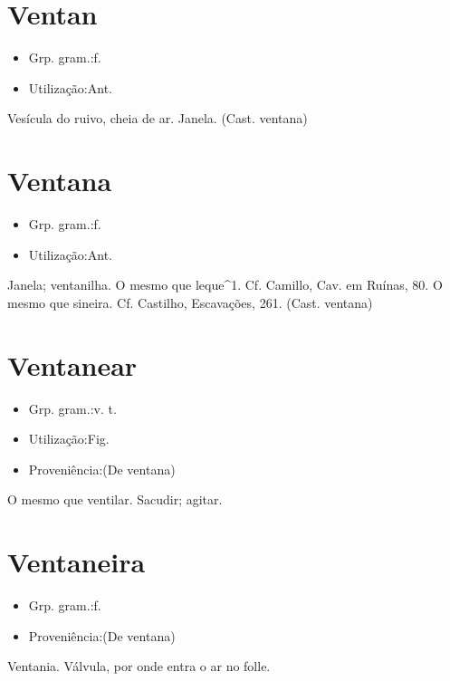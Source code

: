 \documentclass{article}
\begin{document}
\section{Ventan}
\begin{itemize}
\item {Grp. gram.:f.}
\end{itemize}
\begin{itemize}
\item {Utilização:Ant.}
\end{itemize}
Vesícula do ruivo, cheia de ar.
Janela.
(Cast. \textunderscore ventana\textunderscore )
\section{Ventana}
\begin{itemize}
\item {Grp. gram.:f.}
\end{itemize}
\begin{itemize}
\item {Utilização:Ant.}
\end{itemize}
Janela; ventanilha.
O mesmo que \textunderscore leque\textunderscore ^1. Cf. Camillo, \textunderscore Cav. em Ruínas\textunderscore , 80.
O mesmo que \textunderscore sineira\textunderscore . Cf. Castilho, \textunderscore Escavações\textunderscore , 261.
(Cast. \textunderscore ventana\textunderscore )
\section{Ventanear}
\begin{itemize}
\item {Grp. gram.:v. t.}
\end{itemize}
\begin{itemize}
\item {Utilização:Fig.}
\end{itemize}
\begin{itemize}
\item {Proveniência:(De \textunderscore ventana\textunderscore )}
\end{itemize}
O mesmo que \textunderscore ventilar\textunderscore .
Sacudir; agitar.
\section{Ventaneira}
\begin{itemize}
\item {Grp. gram.:f.}
\end{itemize}
\begin{itemize}
\item {Proveniência:(De \textunderscore ventana\textunderscore )}
\end{itemize}
Ventania.
Válvula, por onde entra o ar no folle.
\end{document}
